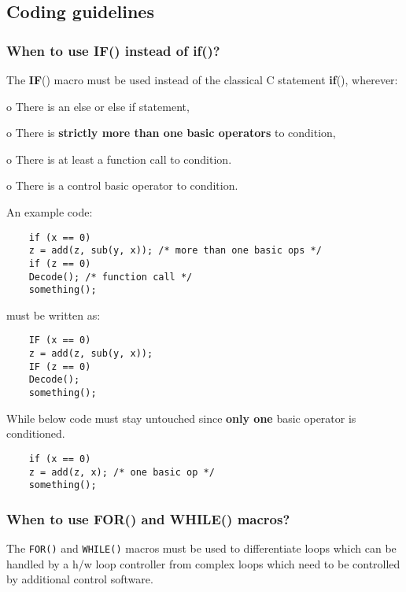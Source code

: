 
\subsection{Coding guidelines}
\subsubsection{When to use IF() instead of if()?}

The \textbf{IF}() macro must be used instead of the classical C
statement \textbf{if}(), wherever:
\begin{list}{}
    \item o There is an else or else if statement, \item o There is
    \textbf{strictly more than one basic operators} to condition, \item
    o There is at least a function call to condition. \item o There is
    a control basic operator to condition.
\end{list}
An example code:
{\small
\begin{verbatim}
    if (x == 0)
    z = add(z, sub(y, x)); /* more than one basic ops */
    if (z == 0)
    Decode(); /* function call */
    something();
\end{verbatim}}
must be written as:
{\small
\begin{verbatim}
    IF (x == 0)
    z = add(z, sub(y, x));
    IF (z == 0)
    Decode();
    something();
\end{verbatim}}

While below code must stay untouched since \textbf{only one} basic
operator
is conditioned.
{\small
\begin{verbatim}
    if (x == 0)
    z = add(z, x); /* one basic op */
    something();
\end{verbatim}}

\subsubsection{When to use FOR() and WHILE() macros?}

The {\tt FOR()} and {\tt WHILE()} macros must be used to differentiate
loops which can be handled by a h/w loop controller from complex loops
which need to be controlled by additional control software.

\flushfloats

